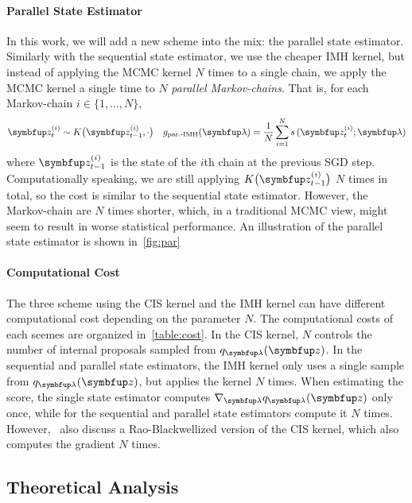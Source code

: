 \vspace{-0.05in}
\paragraph{Parallel State Estimator}
In this work, we will add a new scheme into the mix: the parallel state estimator.
Similarly with the sequential state estimator, we use the cheaper IMH kernel, but instead of applying the MCMC kernel \(N\) times to a single chain, we apply the MCMC kernel a single time to \(N\) \textit{parallel Markov-chains}.
That is, for each Markov-chain \(i \in \{1, \ldots, N\}\),
%
\vspace{-0.05in}
\begin{align}
  &\vz_{t}^{(i)} \sim K\big(\vz_{t-1}^{(i)}, \cdot \big) &g_{\text{par.-IMH}}(\vlambda) = \frac{1}{N} \sum_{i=1}^N s\,(\vz_{t}^{(i)}; \vlambda)
\end{align}
%
where \(\vz_{t-1}^{(i)}\) is the state of the \(i\)th chain at the previous SGD step.
Computationally speaking, we are still applying \(K\big(\vz_{t-1}^{(i)}\big)\) \(N\) times in total, so the cost is similar to the sequential state estimator.
However, the Markov-chain are \(N\) times shorter, which, in a traditional MCMC view, might seem to result in worse statistical performance.
An illustration of the parallel state estimator is shown in~\cref{fig:par}

%

%
\paragraph{Computational Cost}
The three scheme using the CIS kernel and the IMH kernel can have different computational cost depending on the parameter \(N\).
The computational costs of each scemes are organized in~\cref{table:cost}.
In the CIS kernel, \(N\) controls the number of internal proposals sampled from \(q_{\vlambda}(\vz)\).
In the sequential and parallel state estimators, the IMH kernel only uses a single sample from \(q_{\vlambda}(\vz)\), but applies the kernel \(N\) times.
When estimating the score, the single state estimator computes \(\nabla_{\vlambda} q_{\vlambda}(\vz)\) only once, while for the sequential and parallel state estimators compute it \(N\) times.
However,~\cite{NEURIPS2020_b2070693} also discuss a Rao-Blackwellized version of the CIS kernel, which also computes the gradient \(N\) times.

\subsection{Theoretical Analysis}

